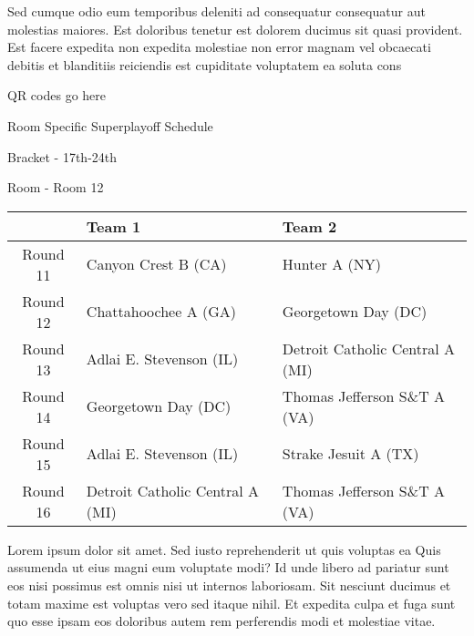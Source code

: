\documentclass{article}%
\begin{document}
\newline%
    Sed cumque odio eum temporibus deleniti ad consequatur consequatur aut molestias maiores. Est doloribus tenetur est dolorem ducimus sit quasi provident. Est facere expedita non expedita molestiae non error magnam vel obcaecati debitis et blanditiis reiciendis est cupiditate voluptatem ea soluta cons%
\vspace*{140pt}%
\begin{center}%
\begin{Huge}%
QR codes go here%
\end{Huge}%
\end{center}%
\newpage%
\begin{center}%
\begin{Huge}%
Room Specific Superplayoff Schedule%
\end{Huge}%
\vspace*{8pt}%
\linebreak%
\begin{Large}%
Bracket {-} 17th{-}24th%
\end{Large}%
\vspace*{8pt}%
\linebreak%
\vspace*{8pt}%
\begin{Large}%
Room {-} Room 12%
\end{Large}%
\end{center}%
%
\begin{tabularx}{\textwidth}{|c|Y|Y|}%
\hline%
&Team 1&Team 2\\%
\hline%
Round 11&Canyon Crest B (CA)&Hunter A (NY)\\%
Round 12&Chattahoochee A (GA)&Georgetown Day (DC)\\%
Round 13&Adlai E. Stevenson (IL)&Detroit Catholic Central A (MI)\\%
Round 14&Georgetown Day (DC)&Thomas Jefferson S\&T A (VA)\\%
Round 15&Adlai E. Stevenson (IL)&Strake Jesuit A (TX)\\%
Round 16&Detroit Catholic Central A (MI)&Thomas Jefferson S\&T A (VA)\\%
\hline%
\end{tabularx}%
\vspace*{8pt}%
\newline%
    Lorem ipsum dolor sit amet. Sed iusto reprehenderit ut quis voluptas ea Quis assumenda ut eius magni eum voluptate modi? Id unde libero ad pariatur sunt eos nisi possimus est omnis nisi ut internos laboriosam. Sit nesciunt ducimus et totam maxime est voluptas vero sed itaque nihil. Et expedita culpa et fuga sunt quo esse ipsam eos doloribus autem rem perferendis modi et molestiae vitae.\newline%
\end{document}
